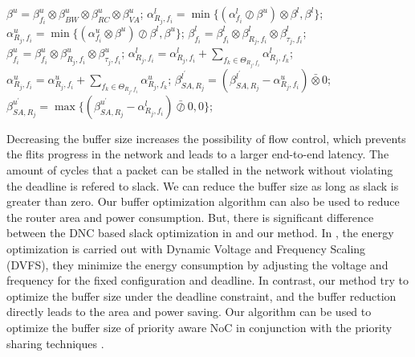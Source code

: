 \documentclass[10pt,journal]{IEEEtran}
\begin{document}
\begin{algorithm}
\begin{algorithmic}[1]
            \STATE $\beta^u=\beta^u_{f_i}\otimes\beta_{BW}^u\otimes\beta_{RC}^u\otimes\beta_{VA}^u$;
            \STATE $\alpha^l_{R_j,f_i}=\min\{(\alpha^l_{f_i}\oslash\beta^u)\otimes\beta^l,\beta^l\}$;
            \STATE $\alpha^u_{R_j,f_i}=\min\{(\alpha^u_{f_i}\otimes\beta^u)\oslash\beta^l,\beta^u\}$;
            \STATE $\beta_{f_i}^l=\beta_{f_i}^l\otimes\beta_{R_j,f_i}^l\otimes\beta_{\tau_j,f_i}^l$;
            \STATE $\beta_{f_i}^u=\beta_{f_i}^u\otimes\beta_{R_j,f_i}^u\otimes\beta_{\tau_j,f_i}^u$;
                    \STATE $\alpha^l_{R_j,f_i}=\alpha^l_{R_j,f_i}+\sum_{f_k\in\Theta_{R_j,f_i}}\alpha^l_{R_j,f_k}$;
                    \STATE $\alpha^u_{R_j,f_i}=\alpha^u_{R_j,f_i}+\sum_{f_k\in\Theta_{R_j,f_i}}\alpha^u_{R_j,f_k}$;
                \ENDIF
                \STATE $\beta^{l^\prime}_{SA,R_j}=(\beta^{l^\prime}_{SA,R_j}-\alpha^u_{R_j,f_i})\bar{\otimes}0$;
                \STATE $\beta^{u^\prime}_{SA,R_j}=\max\{(\beta^{u^\prime}_{SA, R_j}-\alpha^l_{R_j,f_i})\bar{\oslash}0,0\}$;
            \ENDIF
        \ENDFOR
    \ENDFOR
\end{algorithmic}
\end{algorithm}

Decreasing the buffer size increases the possibility of flow control, which prevents the flits progress in the network and leads to a larger end-to-end latency. The amount of cycles that a packet can be stalled in the network without violating the deadline is refered to slack. We can reduce the buffer size as long as slack is greater than zero. Our buffer optimization algorithm can also be used to reduce the router area and power consumption. But, there is significant difference between the DNC based slack optimization in \cite{6560630} and our method. In \cite{6560630}, the energy optimization is carried out with Dynamic Voltage and Frequency Scaling (DVFS), they minimize the energy consumption by adjusting the voltage and frequency for the fixed configuration and deadline. In contrast, our method try to optimize the buffer size under the deadline constraint, and the buffer reduction directly leads to the area and power saving. Our algorithm can be used to optimize the buffer size of priority aware NoC in conjunction with the priority sharing techniques \cite{5161497}.
\end{document}
